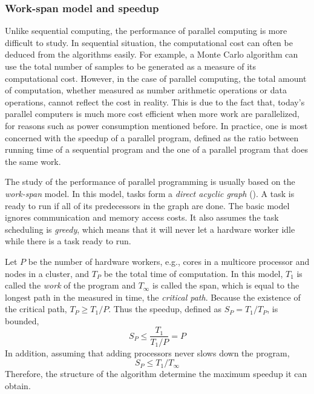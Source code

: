 \subsubsection{Work-span model and speedup}
\label{sub:Work-span model and speedup}

Unlike sequential computing, the performance of parallel computing is more
difficult to study. In sequential situation, the computational cost can often
be deduced from the algorithms easily. For example, a Monte Carlo algorithm
can use the total number of samples to be generated as a measure of its
computational cost. However, in the case of parallel computing, the total
amount of computation, whether measured as number arithmetic operations or
data operations, cannot reflect the cost in reality. This is due to the fact
that, today's parallel computers is much more cost efficient when more work
are parallelized, for reasons such as power consumption mentioned before. In
practice, one is most concerned with the speedup of a parallel program,
defined as the ratio between running time of a sequential program and the one
of a parallel program that does the same work.

The study of the performance of parallel programming is usually based on the
\emph{work-span} model. In this model, tasks form a \emph{direct acyclic
  graph} (\dag). A task is ready to run if all of its predecessors in the
graph are done. The basic model ignores communication and memory access costs.
It also assumes the task scheduling is \emph{greedy}, which means that it will
never let a hardware worker idle while there is a task ready to run.

Let $P$ be the number of hardware workers, e.g., cores in a multicore
processor and nodes in a cluster, and $T_P$ be the total time of computation.
In this model, $T_1$ is called the \emph{work} of the program and $T_{\infty}$
is called the span, which is equal to the longest path in the \dag measured in
time, the \emph{critical path}. Because the existence of the critical path,
$T_P \ge T_1/P$. Thus the speedup, defined as $S_P = T_1/T_P$, is bounded,
\begin{equation}
  S_P \le \frac{T_1}{T_1/P} = P
\end{equation}
In addition, assuming that adding processors never slows down the program,
\begin{equation}
  S_P \le T_1/T_{\infty}
\end{equation}
Therefore, the structure of the algorithm determine the maximum speedup it can
obtain.

